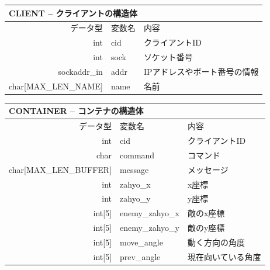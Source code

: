 \documentclass{jarticle}
\begin{document}
\begin{table}[H]
\begin{tabular}{|r|l|l|}
\hline
\multicolumn{3}{|l|}{CLIENT -- クライアントの構造体}       \\ \hline
データ型      & 変数名    & 内容        \\ \hline
int & cid & クライアントID \\
int  & sock     & ソケット番号  \\
sockaddr\_in & addr & IPアドレスやポート番号の情報  \\
  char[MAX\_LEN\_NAME] & name & 名前 \\ \hline
\end{tabular}
\end{table}


\begin{table}[H]
\begin{tabular}{|r|l|l|}
\hline
\multicolumn{3}{|l|}{CONTAINER -- コンテナの構造体}       \\ \hline
データ型      & 変数名    & 内容        \\ \hline
int & cid & クライアントID \\
  char & command & コマンド \\
  char[MAX\_LEN\_BUFFER] & message & メッセージ \\
  int & zahyo\_x & x座標 \\
  int & zahyo\_y & y座標 \\
  int[5] & enemy\_zahyo\_x  & 敵のx座標 \\
  int[5] & enemy\_zahyo\_y  & 敵のy座標 \\
  int[5] & move\_angle & 動く方向の角度 \\
  int[5] & prev\_angle & 現在向いている角度 \\\hline
\end{tabular}
\end{table}
\end{document}

